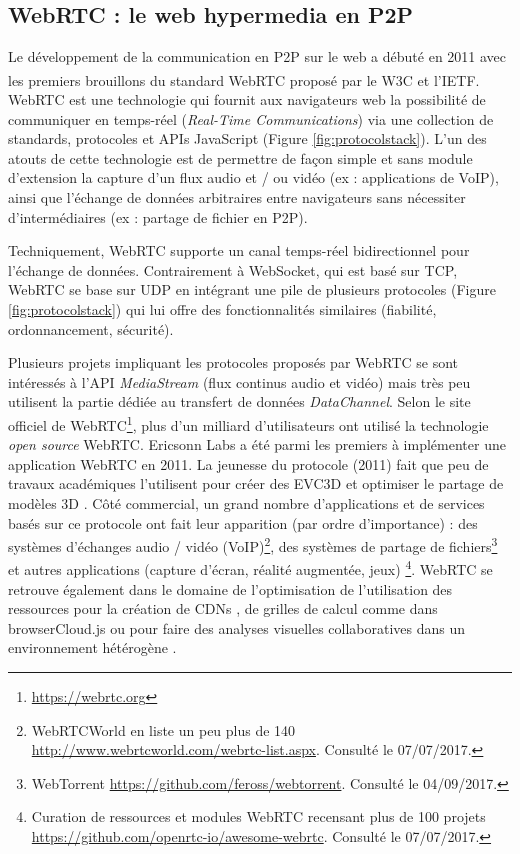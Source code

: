 \subsection{WebRTC : le web hypermedia en P2P}
\label{sec:webrtc}

Le développement de la communication en \gls{P2P} sur le web a 
débuté en 2011 avec les premiers brouillons du standard \gls{WebRTC} proposé 
par le \gls{W3C} et l'\gls{IETF}\textsuperscript{\textregistered}. 
\gls{WebRTC} est une technologie qui fournit aux navigateurs web la possibilité de 
communiquer en temps-réel (\textit{Real-Time Communications}) via une collection 
de standards, protocoles et \glspl{API} JavaScript (Figure \ref{fig:protocolstack}). 
L'un des atouts de cette technologie est de permettre de façon simple et 
sans module d'extension la capture d'un flux audio et / ou vidéo (ex : 
applications de VoIP), ainsi que l'échange de données arbitraires entre 
navigateurs sans nécessiter d'intermédiaires (ex : partage de fichier en 
P2P).


Techniquement, \gls{WebRTC} supporte un canal temps-réel 
bidirectionnel pour l'échange de données. Contrairement à 
\gls{WebSocket}, qui est basé sur \gls{TCP}, \gls{WebRTC} se base sur 
\acrshort{UDP} en intégrant une pile de plusieurs protocoles (Figure 
\ref{fig:protocolstack}) qui lui offre des fonctionnalités similaires (fiabilité, 
ordonnancement, sécurité). 


Plusieurs projets impliquant les protocoles proposés par \gls{WebRTC} 
se sont intéressés à l'\gls{API} \textit{MediaStream} (flux continus audio 
et vidéo) mais très peu utilisent la partie dédiée au transfert de données 
\textit{DataChannel}. 
Selon le site officiel de WebRTC\footnote{\url{https://webrtc.org}}, plus d'un milliard 
d'utilisateurs ont utilisé la technologie \textit{open source} WebRTC. Ericsonn Labs 
a été parmi les premiers à implémenter une application WebRTC en 2011. 
La jeunesse du protocole (2011) fait que peu de travaux académiques 
l'utilisent pour créer des \gls{EVC3D} \cite{Desprat2015a,Steiakaki2016} et 
optimiser le partage de modèles \gls{3D} \cite{Koskela2014}. 
Côté commercial, un grand nombre d'applications et de services 
basés sur ce protocole ont fait leur apparition (par ordre d'importance) : 
des systèmes d'échanges audio / vidéo (VoIP)\footnote{WebRTCWorld en 
	liste un peu plus de 140 
	\url{http://www.webrtcworld.com/webrtc-list.aspx}. Consulté le 
	07/07/2017.}, des systèmes de partage de fichiers\footnote{WebTorrent 
	\url{https://github.com/feross/webtorrent}. Consulté le 04/09/2017.} et 
autres applications (capture d'écran, réalité augmentée, jeux)
\footnote{Curation de ressources et modules WebRTC 
	recensant plus de 100 projets 
	\url{https://github.com/openrtc-io/awesome-webrtc}. Consulté le 
	07/07/2017.}. WebRTC se retrouve également dans le domaine de l'optimisation 
	de l'utilisation des ressources pour la création de \glspl{CDN} 
	\cite{Zhang2013b}, de grilles de calcul comme dans
	browserCloud.js \cite{Dias2015a} ou pour faire des analyses visuelles 
	collaboratives dans un environnement hétérogène \cite{Li2015}.



